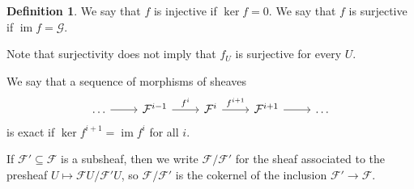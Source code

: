 \documentclass[a4paper]{amsbook}
\theoremstyle{definition}
\newtheorem*{definition*}{Definition}
\DeclareMathOperator\im{im}
\begin{document}
\begin{definition*}
\label{InjectiveMorphism}
We say that $f$ is injective if $\ker f = 0$. We say that $f$ is surjective if $\im f = \mathcal{G}$.

Note that surjectivity does not imply that $f_U$ is surjective for every $U$.

We say that a sequence of morphisms of sheaves
\[\begin{tikzcd}
	\ldots \arrow[r] & \mathcal{F}^{i-1} \arrow[r, "f^i"] & \mathcal{F}^i \arrow[r, "f^{i+1}"] & \mathcal{F}^{i+1} \arrow[r] & \ldots
\end{tikzcd}\]
is exact if $\ker f^{i+1} = \im f^i$ for all $i$.

If $\mathcal{F}' \subseteq \mathcal{F}$ is a subsheaf, then we write $\mathcal{F}/\mathcal{F}'$ for the
sheaf associated to the presheaf $U\mapsto \mathcal{F}U/\mathcal{F}'U$, so $\mathcal{F}/\mathcal{F}'$ is
the cokernel of the inclusion $\mathcal{F}' \to \mathcal{F}$.
\end{definition*}
\end{document}
